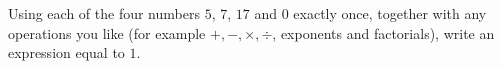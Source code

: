 Using each of the four numbers $5$, $7$, $17$ and $0$ exactly once, together with any operations you like (for example $+,-,\times,\div$, exponents and factorials), write an expression equal to $1$.
